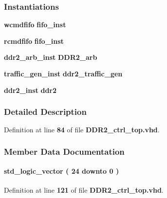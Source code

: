 \subsubsection*{Instantiations}
 \begin{DoxyCompactItemize}
\item 
{\bf wcmdfifo}  {\bfseries fifo\+\_\+inst}   
\item 
{\bf rcmdfifo}  {\bfseries fifo\+\_\+inst}   
\item 
{\bf ddr2\+\_\+arb\+\_\+inst}  {\bfseries D\+D\+R2\+\_\+arb}   
\item 
{\bf traffic\+\_\+gen\+\_\+inst}  {\bfseries ddr2\+\_\+traffic\+\_\+gen}   
\item 
{\bf ddr2\+\_\+inst}  {\bfseries ddr2}   
\end{DoxyCompactItemize}


\subsubsection{Detailed Description}


Definition at line {\bf 84} of file {\bf D\+D\+R2\+\_\+ctrl\+\_\+top.\+vhd}.



\subsubsection{Member Data Documentation}
\paragraph[{avl\+\_\+addr}]{ {\bfseries \textcolor{comment}{std\+\_\+logic\+\_\+vector}\textcolor{vhdlchar}{ }\textcolor{vhdlchar}{(}\textcolor{vhdlchar}{ }\textcolor{vhdlchar}{ } \textcolor{vhdldigit}{24} \textcolor{vhdlchar}{ }\textcolor{keywordflow}{downto}\textcolor{vhdlchar}{ }\textcolor{vhdlchar}{ } \textcolor{vhdldigit}{0} \textcolor{vhdlchar}{ }\textcolor{vhdlchar}{)}\textcolor{vhdlchar}{ }} \hspace{0.3cm}{\ttfamily [Signal]}}\label{classDDR2__ctrl__top_1_1arch_aa9e80dac1c979ae84856ecfc705c2fd8}


Definition at line {\bf 121} of file {\bf D\+D\+R2\+\_\+ctrl\+\_\+top.\+vhd}.

